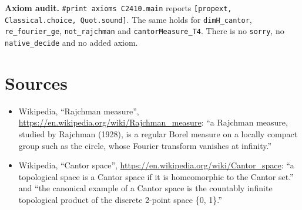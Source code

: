 \documentclass[11pt]{article}
\theoremstyle{definition}
\begin{document}
\textbf{Axiom audit.} \texttt{\#print axioms C2410.main} reports
\texttt{[propext, Classical.choice, Quot.sound]}. The same holds for \texttt{dimH\_cantor},
\texttt{re\_fourier\_ge}, \texttt{not\_rajchman} and \texttt{cantorMeasure\_T4}. There is no
\texttt{sorry}, no \texttt{native\_decide} and no added axiom.

\section*{Sources}
\begin{itemize}
\item[{[W1]}] Wikipedia, ``Rajchman measure'', \url{https://en.wikipedia.org/wiki/Rajchman_measure}:
``a Rajchman measure, studied by Rajchman (1928), is a regular Borel measure on a locally compact
group such as the circle, whose Fourier transform vanishes at infinity.''
\item[{[W2]}] Wikipedia, ``Cantor space'', \url{https://en.wikipedia.org/wiki/Cantor_space}:
``a topological space is a Cantor space if it is homeomorphic to the Cantor set.'' and ``the
canonical example of a Cantor space is the countably infinite topological product of the discrete
2-point space \{0, 1\}.''
\end{itemize}
\end{document}
